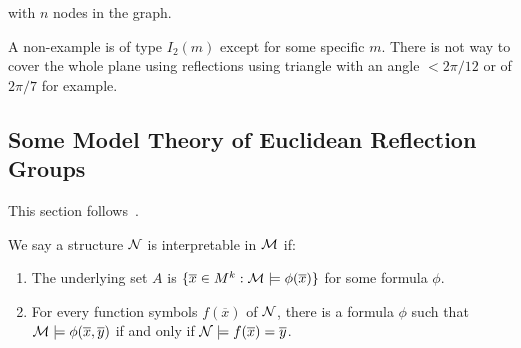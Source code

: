 \documentclass[../main.tex]{subfiles}
\begin{document}
\begin{figure}[H]
\centering
{}
\end{figure}
with $n$ nodes in the graph.

A non-example is of type $I_2(m)$ except for some specific $m$. There is not way to cover the whole plane using reflections using triangle with an angle $<2\pi/12$ or of $2\pi/7$ for example.

\subsection{Some Model Theory of Euclidean Reflection Groups}


This section follows~\cite{MuhlherrPaoliniShelah2022}.

\begin{definition}
    We say a structure $\mathcal{N}$ is interpretable in $\mathcal{M}$ if:\begin{enumerate}
        \item The underlying set $A$ is $\{\overline x \in M^k:\mathcal{M}\models \phi(\overline x)\}$ for some formula $\phi$.
        \item For every function symbols $f(\overline x)$ of $\mathcal{N}$, there is a formula $\phi$ such that $\mathcal{M} \models \phi(\overline x,\overline y)$ if and only if $\mathcal{N} \models f(\overline x)=\overline y$.
    \end{enumerate}
\end{definition}
\end{document}
